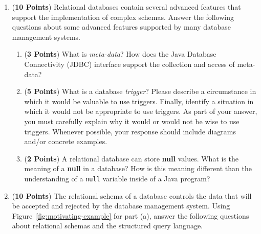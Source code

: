 \documentclass[12pt]{article}
\begin{document}
\begin{enumerate}
\begin{enumerate}
            \end{enumerate}

            \newpage

          \item ({\bf 10 Points}) Relational databases contain several advanced
            features that support the implementation of complex schemas.  Answer
            the following questions about some advanced features supported by
            many database management systems.

            \begin{enumerate}

              \item ({\bf 3 Points}) What is {\em meta-data}?  How does the Java
                Database Connectivity (JDBC) interface support the collection and
                access of meta-data?  


                \item ({\bf 5 Points}) What is a database {\em trigger}?  Please
                  describe a circumstance in which it would be valuable to use
                  triggers.  Finally, identify a situation in which it would not be
                  appropriate to use triggers.  As part of your answer, you must
                  carefully explain why it would or would not be wise to use
                  triggers.  Whenever possible, your response should include
                  diagrams and/or concrete examples.

                \item ({\bf 2 Points}) A relational database can store {\bf null}
                  values.  What is the meaning of a {\bf null} in a database?  How
                  is this meaning different than the understanding of a {\tt null}
                  variable inside of a Java program?

              \end{enumerate}

              \newpage

            \item ({\bf 10 Points}) The relational schema of a database controls
              the data that will be accepted and rejected by the database
              management system.  Using Figure~\ref{fig:motivating-example} for
              part (a), answer the following questions about relational schemas
              and the structured query language.


\end{enumerate}
\end{document}
